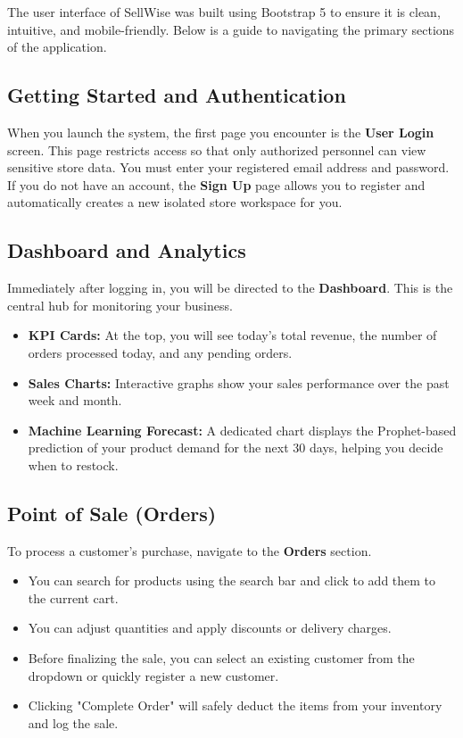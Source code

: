 \documentclass[12pt,a4paper]{report}
\begin{document}
The user interface of SellWise was built using Bootstrap 5 to ensure it is clean, intuitive, and mobile-friendly. Below is a guide to navigating the primary sections of the application.

\subsection{Getting Started and Authentication}
When you launch the system, the first page you encounter is the \textbf{User Login} screen. This page restricts access so that only authorized personnel can view sensitive store data. You must enter your registered email address and password. If you do not have an account, the \textbf{Sign Up} page allows you to register and automatically creates a new isolated store workspace for you.

\subsection{Dashboard and Analytics}
Immediately after logging in, you will be directed to the \textbf{Dashboard}. This is the central hub for monitoring your business.
\begin{itemize}
    \item \textbf{KPI Cards:} At the top, you will see today's total revenue, the number of orders processed today, and any pending orders.
    \item \textbf{Sales Charts:} Interactive graphs show your sales performance over the past week and month.
    \item \textbf{Machine Learning Forecast:} A dedicated chart displays the Prophet-based prediction of your product demand for the next 30 days, helping you decide when to restock.
\end{itemize}

\subsection{Point of Sale (Orders)}
To process a customer's purchase, navigate to the \textbf{Orders} section. 
\begin{itemize}
    \item You can search for products using the search bar and click to add them to the current cart.
    \item You can adjust quantities and apply discounts or delivery charges.
    \item Before finalizing the sale, you can select an existing customer from the dropdown or quickly register a new customer.
    \item Clicking "Complete Order" will safely deduct the items from your inventory and log the sale.
\end{itemize}
\end{document}

